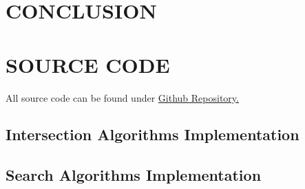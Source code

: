 \documentclass[paper=a4, fontsize=11pt]{scrartcl} %
\numberwithin{equation}{section} %
\numberwithin{figure}{section} %
\numberwithin{table}{section} %
\begin{document}
\section{CONCLUSION}



\newpage
\section{SOURCE CODE}

All source code can be found under  \href{https://github.com/ozgurgundogan/Efficient-set-intersection-for-inverted-indexing}{Github Repository.}


\subsection{Intersection Algorithms Implementation}


\newpage
\subsection{Search Algorithms Implementation}

\end{document}
